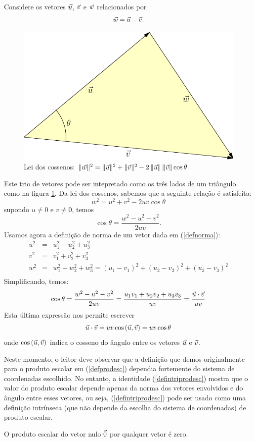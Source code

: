 Considere os vetores $\vec{u}$, $\vec{v}$ e $\vec{w}$ relacionados por $$\vec{w}=\vec{u}-\vec{v}.$$
\begin{figure}
        \includegraphics[width=\textwidth]{./cap_algvet/pics/cossenos} %
    \caption{Lei dos cossenos: $\|\vec{w}\|^2=\|\vec{u}\|^2+\|\vec{v}\|^2-2~\!\|\vec{u}\|~\!\|\vec{v}\|\cos\theta$}\label{leicossenos}
\end{figure}
Este trio de vetores pode ser intepretado como os três lados de um triângulo como na figura \ref{leicossenos}. Da lei dos cossenos, sabemos que a seguinte relação é satisfeita:
 $$w^2=u^2+v^2-2uv\cos\theta$$
supondo $u\neq 0$ e $v\neq 0$, temos
$$\cos\theta = \frac{w^2-u^2-v^2}{2uv}.$$
Usamos agora a definição de norma de um vetor dada em (\ref{defnorma}):
\begin{eqnarray*}
u^2&=&u_1^2+u_2^2+u_3^2\\
v^2&=&v_1^2+v_2^2+v_3^2\\
w^2&=&w_1^2+w_2^2+w_3^2=\left(u_1-v_1\right)^2+\left(u_2-v_2\right)^2+\left(u_3-v_3\right)^2\\
\end{eqnarray*}
Simplificando, temos:
$$\cos\theta = \frac{w^2-u^2-v^2}{2uv}=\frac{u_1v_1+u_2v_2+u_3v_3}{uv}=\frac{\vec{u}\cdot\vec{v}}{uv}$$
Esta última expressão nos permite escrever
\begin{equation}\label{defintriprodesc}
\vec{u}\cdot\vec{v}=uv\cos\left(\vec{u},\vec{v}\right)=uv\cos\theta
\end{equation}
onde $\cos\left(\vec{u},\vec{v}\right)$ indica o cosseno do ângulo entre os vetores $\vec{u}$ e $\vec{v}$.
\begin{obs}Neste momento, o leitor deve observar que a definição que demos originalmente para o produto escalar em (\ref{defprodesc}) dependia fortemente do sistema de coordenadas escolhido. No entanto, a identidade (\ref{defintriprodesc}) mostra que o valor do produto escalar depende apenas da norma dos vetores envolvidos e do ângulo entre esses vetores, ou seja,  (\ref{defintriprodesc}) pode ser usado como uma definição intrínseca (que não depende da escolha do sistema de coordenadas) de produto escalar. \end{obs}
\begin{obs}O produto escalar do vetor nulo $\vec{0}$ por qualquer vetor é zero.\end{obs}


